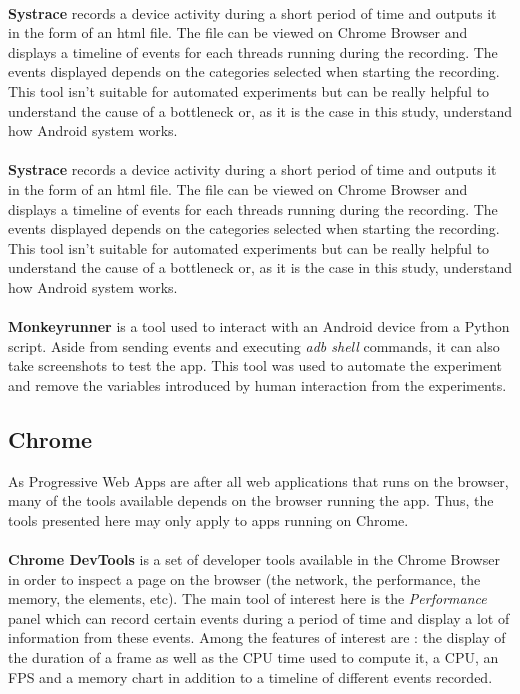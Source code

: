 \paragraph{}
\textbf{Systrace} \cite{systrace} records a device activity during a short period of time and outputs it in the form of an html file. The file can be viewed on Chrome Browser and displays a timeline of events for each threads running during the recording. The events displayed depends on the categories selected when starting the recording. This tool isn't suitable for automated experiments but can be really helpful to understand the cause of a bottleneck or, as it is the case in this study, understand how Android system works.

\paragraph{}
\textbf{Systrace} \cite{systrace} records a device activity during a short period of time and outputs it in the form of an html file. The file can be viewed on Chrome Browser and displays a timeline of events for each threads running during the recording. The events displayed depends on the categories selected when starting the recording. This tool isn't suitable for automated experiments but can be really helpful to understand the cause of a bottleneck or, as it is the case in this study, understand how Android system works.

\paragraph{}
\textbf{Monkeyrunner} \cite{monkeyrunner} is a tool used to interact with an Android device from a Python script. Aside from sending events and executing \textit{adb shell} commands, it can also take screenshots to test the app. This tool was used to automate the experiment and remove the variables introduced by human interaction from the experiments. 

\subsection{Chrome}

As Progressive Web Apps are after all web applications that runs on the browser, many of the tools available depends on the browser running the app. Thus, the tools presented here may only apply to apps running on Chrome.

\paragraph{}
\textbf{Chrome DevTools} is a set of developer tools available in the Chrome Browser in order to inspect a page on the browser (the network, the performance, the memory, the elements, etc). The main tool of interest here is the \textit{Performance} panel \cite{chrome_devtools_perf} which can record certain events during a period of time and display a lot of information from these events. Among the features of interest are : the display of the duration of a frame as well as the CPU time used to compute it, a CPU, an FPS and a memory chart in addition to a timeline of different events recorded.

